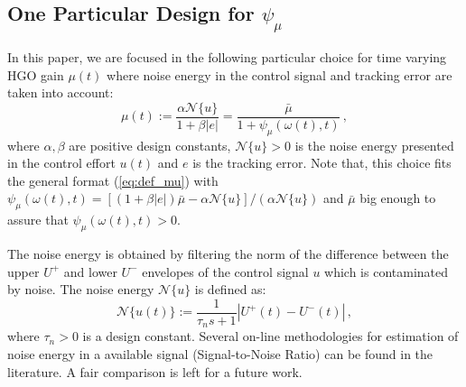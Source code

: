 \documentclass[letterpaper, 10 pt, conference]{ieeeconf}  %
\theoremstyle{plain}
\theoremstyle{definition}
\theoremstyle{remark}
\begin{document}
\subsection{One Particular Design for $\psi_\mu$}
%
%

In this paper, we are focused in the following particular choice for time varying HGO gain $\mu(t)$ where noise energy in the control signal and tracking error are taken into account: 
%
\begin{equation}
\mu(t):=\frac{\alpha \mathcal{N}\{u\}}{1+\beta |e|}=\frac{\bar{\mu}}{1+
\psi_\mu(\omega(t),t)}\,,\label{eq:def_mupratico}
\end{equation}
%
where $\alpha,\beta$ are positive design constants, $\mathcal{N}\{u\}>0$ is the noise energy presented in the control effort $u(t)$ and $e$ is the tracking error. Note that, this choice fits the general format (\ref{eq:def_mu}) with $\psi_\mu(\omega(t),t)=[(1+\beta |e|) \bar{\mu}-\alpha \mathcal{N}\{u\}]/(\alpha \mathcal{N}\{u\})$ and $\bar{\mu}$ big enough to assure that  $\psi_\mu(\omega(t),t)>0$. 

The noise energy is obtained by filtering the norm of the difference between 
the upper $U^{+}$ and lower $U^{-}$ envelopes of the control signal $u$ which is contaminated by noise. The noise energy $\mathcal{N}\{u\}$ is defined as:
%
%
$$\mathcal{N}\{u(t)\}:=\frac{1}{\tau_n s +1} \left|U^{+}(t)-U^{-}(t)\right|\,,$$
%
where $\tau_n>0$ is a design constant. Several  on-line methodologies for estimation of noise energy in a available signal (Signal-to-Noise Ratio) can be found in the literature. A fair comparison is left for a future work.  
\end{document}
